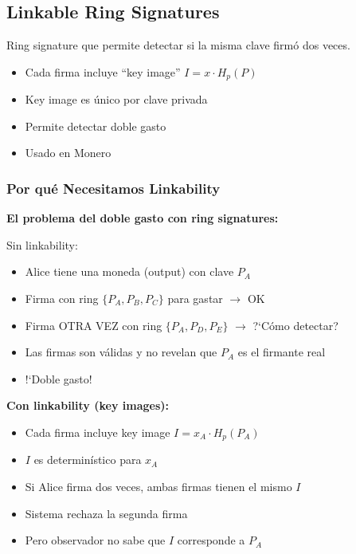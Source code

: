 \documentclass[11pt,a4paper,twoside]{book}
\begin{document}
\subsection{Linkable Ring Signatures}

\begin{definition}
Ring signature que permite detectar si la misma clave firm\'o dos veces.
\end{definition}

\begin{itemize}
    \item Cada firma incluye ``key image'' $I = x \cdot H_p(P)$
    \item Key image es \'unico por clave privada
    \item Permite detectar doble gasto
    \item Usado en Monero
\end{itemize}

\subsubsection{Por qu\'e Necesitamos Linkability}

\begin{intuicion}
\textbf{El problema del doble gasto con ring signatures:}

Sin linkability:
\begin{itemize}
    \item Alice tiene una moneda (output) con clave $P_A$
    \item Firma con ring $\{P_A, P_B, P_C\}$ para gastar $\to$ OK
    \item Firma OTRA VEZ con ring $\{P_A, P_D, P_E\}$ $\to$ ?`C\'omo detectar?
    \item Las firmas son v\'alidas y no revelan que $P_A$ es el firmante real
    \item !`Doble gasto!
\end{itemize}

\textbf{Con linkability (key images):}
\begin{itemize}
    \item Cada firma incluye key image $I = x_A \cdot H_p(P_A)$
    \item $I$ es determin\'istico para $x_A$
    \item Si Alice firma dos veces, ambas firmas tienen el mismo $I$
    \item Sistema rechaza la segunda firma
    \item Pero observador no sabe que $I$ corresponde a $P_A$
\end{itemize}
\end{intuicion}
\end{document}
